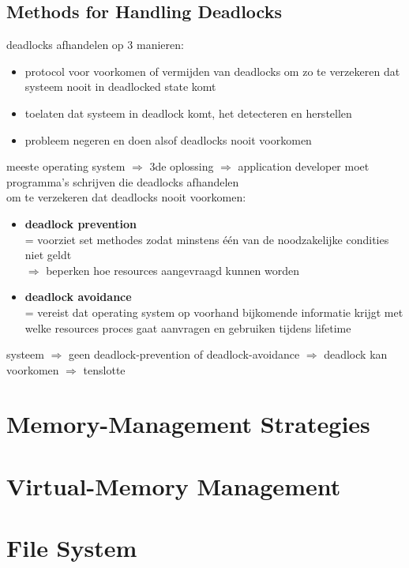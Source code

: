 \documentclass{report}
\begin{document}
\section{Methods for Handling Deadlocks}
deadlocks afhandelen op 3 manieren:
\begin{itemize}
\item protocol voor voorkomen of vermijden van deadlocks om zo te verzekeren dat systeem nooit in deadlocked state komt
\item toelaten dat systeem in deadlock komt, het detecteren en herstellen
\item probleem negeren en doen alsof deadlocks nooit voorkomen
\end{itemize}
meeste operating system $\Rightarrow$ 3de oplossing $\Rightarrow$ application developer moet programma's schrijven die deadlocks afhandelen
\\om te verzekeren dat deadlocks nooit voorkomen:
\begin{itemize}
\item \textbf{deadlock prevention} 
\\= voorziet set methodes zodat minstens \'e\'en van de noodzakelijke condities niet geldt
\\$\Rightarrow$ beperken hoe resources aangevraagd kunnen worden
\item \textbf{deadlock avoidance}
\\= vereist dat operating system op voorhand bijkomende informatie krijgt met welke resources proces gaat aanvragen en gebruiken tijdens lifetime
\end{itemize}
systeem $\Rightarrow$ geen deadlock-prevention of deadlock-avoidance $\Rightarrow$ deadlock kan voorkomen $\Rightarrow$ tenslotte
\chapter{Memory-Management Strategies}
\chapter{Virtual-Memory Management}
\chapter{File System}
\end{document}
